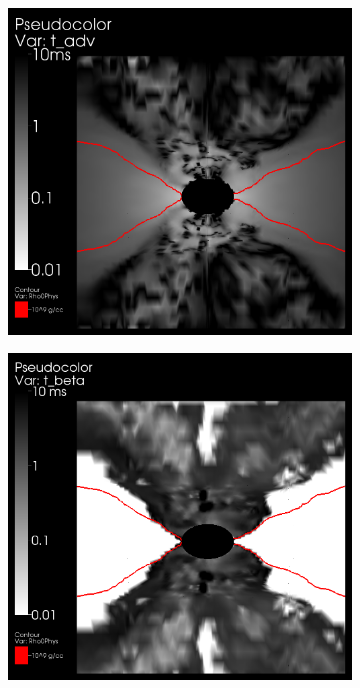 \begin{figure}
  \centering
  \begin{subfigure}{.45\textwidth}
    \centering
    \includegraphics[width=1\linewidth]{Figures/timescales-slice-tadv}
  \end{subfigure}
  \begin{subfigure}{.45\textwidth}
    \centering
    \includegraphics[width=1\linewidth]{Figures/timescales-slice-tbeta}

\end{subfigure}
\end{figure}
